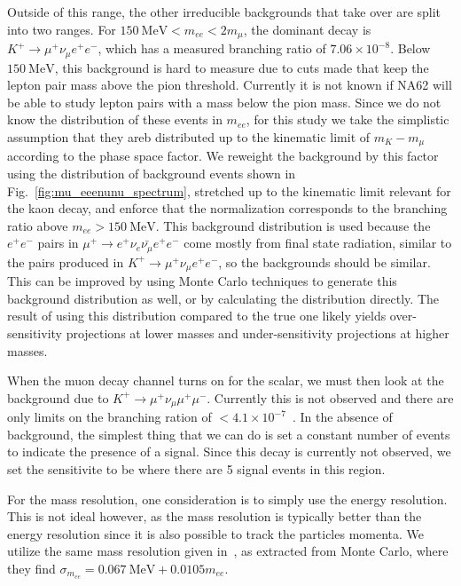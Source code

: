 Outside of this range, the other irreducible backgrounds that take over are split into two ranges.
For $150~\textrm{MeV} < m_{ee} < 2m_\mu$, the dominant decay is $K^+ \rightarrow \mu^+ \nu_\mu e^+ e^-$, which has a measured branching ratio of $7.06 \times 10^{-8}$.
Below $150~\textrm{MeV}$, this background is hard to measure due to cuts made that keep the lepton pair mass above the pion threshold.
Currently it is not known if NA62 will be able to study lepton pairs with a mass below the pion mass.
Since we do not know the distribution of these events in $m_{ee}$, for this study we take the simplistic assumption that they areb distributed up to the kinematic limit of $m_K - m_\mu$ according to the phase space factor.
We reweight the background by this factor using the distribution of background events shown in Fig.~\ref{fig:mu_eeenunu_spectrum}, stretched up to the kinematic limit relevant for the kaon decay, and enforce that the normalization corresponds to the branching ratio above $m_{ee} > 150~\textrm{MeV}$.
This background distribution is used because the $e^+ e^-$ pairs in $\mu^+ \rightarrow e^+ \nu_e \bar{\nu_\mu} e^+ e^-$ come mostly from final state radiation, similar to the pairs produced in $K^+ \rightarrow \mu^+ \nu_\mu e^+ e^-$, so the backgrounds should be similar.
This can be improved by using Monte Carlo techniques to generate this background distribution as well, or by calculating the distribution directly.
The result of using this distribution compared to the true one likely yields over-sensitivity projections at lower masses and under-sensitivity projections at higher masses.

When the muon decay channel turns on for the scalar, we must then look at the background due to $K^+ \rightarrow \mu^+ \nu_\mu \mu^+ \mu^-$.
Currently this is not observed and there are only limits on the branching ration of $< 4.1 \times 10^{-7}$~\cite{Agashe:2014kda}.
In the absence of background, the simplest thing that we can do is set a constant number of events to indicate the presence of a signal.
Since this decay is currently not observed, we set the sensitivite to be where there are 5 signal events in this region.

For the mass resolution, one consideration is to simply use the energy resolution.
This is not ideal however, as the mass resolution is typically better than the energy resolution since it is also possible to track the particles momenta.
We utilize the same mass resolution given in~\cite{Batley:2015lha}, as extracted from Monte Carlo, where they find $\sigma_{m_{ee}} = 0.067~\textrm{MeV} + 0.0105 m_{ee}$.

